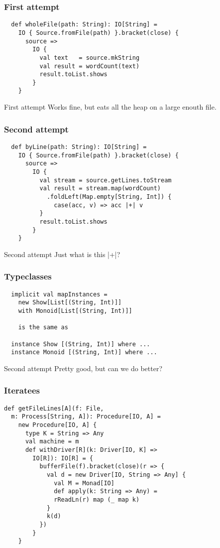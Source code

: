\documentclass{beamer}
\begin{document}
\begin{frame}[fragile]
\frametitle{First attempt}
\begin{lstlisting}
  def wholeFile(path: String): IO[String] =
    IO { Source.fromFile(path) }.bracket(close) {
      source =>
        IO {
          val text   = source.mkString
          val result = wordCount(text)
          result.toList.shows
        }
    }
\end{lstlisting}
\end{frame}

\begin{frame}{First attempt}
  Works fine, but eats all the heap on a large enouth file.
\end{frame}

\begin{frame}[fragile]
\frametitle{Second attempt}
\begin{lstlisting}
  def byLine(path: String): IO[String] =
    IO { Source.fromFile(path) }.bracket(close) {
      source =>
        IO {
          val stream = source.getLines.toStream
          val result = stream.map(wordCount)
            .foldLeft(Map.empty[String, Int]) {
              case(acc, v) => acc |+| v
          }
          result.toList.shows
        }
    }
\end{lstlisting}
\end{frame}

\begin{frame}{Second attempt}
  Just what is this |+|?
\end{frame}

\begin{frame}[fragile]
\frametitle{Typeclasses}
\begin{lstlisting}
  implicit val mapInstances =
    new Show[List[(String, Int)]]
    with Monoid[List[(String, Int)]]

    is the same as

  instance Show [(String, Int)] where ...
  instance Monoid [(String, Int)] where ...
\end{lstlisting}
\end{frame}

\begin{frame}{Second attempt}
  Pretty good, but can we do better?
\end{frame}

\begin{frame}[fragile]
\frametitle{Iteratees}
\begin{lstlisting}
def getFileLines[A](f: File,
  m: Process[String, A]): Procedure[IO, A] =
    new Procedure[IO, A] {
      type K = String => Any
      val machine = m
      def withDriver[R](k: Driver[IO, K] =>
        IO[R]): IO[R] = {
          bufferFile(f).bracket(close)(r => {
            val d = new Driver[IO, String => Any] {
              val M = Monad[IO]
              def apply(k: String => Any) =
              rReadLn(r) map (_ map k)
            }
            k(d)
          })
        }
    }
\end{lstlisting}
\end{frame}
\end{document}
